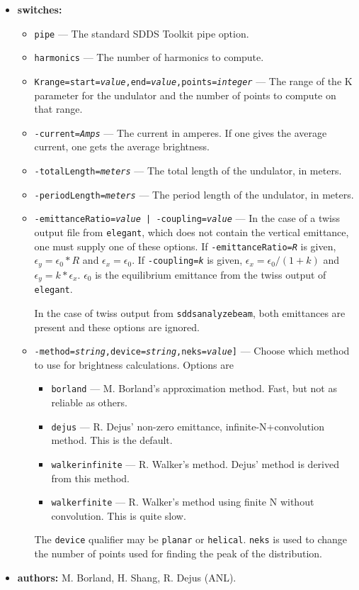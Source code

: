 \documentclass[11pt]{article}
\begin{document}
\begin{itemize}
\item {\bf switches:}
\begin{itemize}
\item {\tt pipe} --- The standard SDDS Toolkit pipe option.
\item {\tt harmonics} --- The number of harmonics to compute.
\item {\tt Krange=start={\em value},end={\em value},points={\em integer}} --- The range of the
 K parameter for the undulator and the number of points to compute on that range.
\item {\tt -current={\em Amps}} --- The current in amperes.  If one gives the average current,
 one gets the average brightness.  
\item {\tt -totalLength={\em meters}} --- The total length of the undulator, in meters.
\item {\tt -periodLength={\em meters}} ---  The period length of the undulator, in meters.
\item {\tt -emittanceRatio={\em value} | -coupling={\em value}} --- In the case of a twiss
 output file from {\tt elegant}, which does not contain the vertical emittance, one must
 supply one of these options.  If {\tt -emittanceRatio={\em R}} is given, $\epsilon_y = \epsilon_0*R$ 
 and $\epsilon_x = \epsilon_0$. If {\tt -coupling={\em k}} is given, $\epsilon_x = \epsilon_0/(1+k)$
 and $\epsilon_y = k*\epsilon_x$.  $\epsilon_0$ is the equilibrium emittance from the twiss output
 of {\tt elegant}.  

 In the case of twiss output from {\tt sddsanalyzebeam}, both emittances are present and these options
 are ignored.
\item {\tt -method={\em string},device={\em string},neks={\em value}]} --- Choose which method to
 use for brightness calculations.  Options are
 \begin{itemize} 
 \item {\tt borland} --- M. Borland's approximation method. Fast, but not as reliable as others.
 \item {\tt dejus} --- R. Dejus' non-zero emittance, infinite-N+convolution method.  This is the
   default.
 \item {\tt walkerinfinite} --- R. Walker's method.  Dejus' method is derived from this method.
 \item {\tt walkerfinite} --- R. Walker's method using finite N without convolution.  This is 
   quite slow.
 \end{itemize}
 The {\tt device} qualifier may be {\tt planar} or {\tt helical}.  {\tt neks} is used to 
 change the number of points used for finding the peak of the distribution.
\end{itemize}

\item {\bf authors:} M. Borland, H. Shang, R. Dejus (ANL).
\end{itemize}
\end{document}
